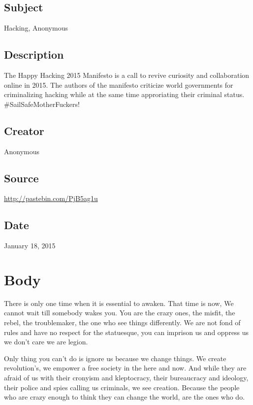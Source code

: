 \documentclass[letterpaper,12pt,english]{sphinxmanual}
\begin{document}
\subsection{Subject}
\label{happy-hacking:subject}
Hacking, Anonymous


\subsection{Description}
\label{happy-hacking:description}
The Happy Hacking 2015 Manifesto is a call to revive curiosity and collaboration online in 2015. The authors of the manifesto criticize world governments for criminalizing hacking while at the same time approriating their criminal status. \#SailSafeMotherFuckers!


\subsection{Creator}
\label{happy-hacking:creator}
Anonymous


\subsection{Source}
\label{happy-hacking:source}
\url{http://pastebin.com/PjB5ag1u}


\subsection{Date}
\label{happy-hacking:date}
January 18, 2015


\section{Body}
\label{happy-hacking:body}
There is only one time when it is essential to awaken. That time is now,
We cannot wait till somebody wakes you. You are the crazy ones, the misfit, the rebel,
the troublemaker, the one who see things differently.
We are not fond of rules and have no respect for the statuesque,
you can imprison us and oppress us we don't care we are legion.

Only thing you can’t do is ignore us because we change things. We create
revolution's, we empower a free society in the here and now.
And while they are afraid of us with their cronyism and kleptocracy,
their bureaucracy and ideology, their police and spies calling us criminals,
we see creation.
Because the people who are crazy enough to
think they can change the world,
are the ones who do.
\end{document}
